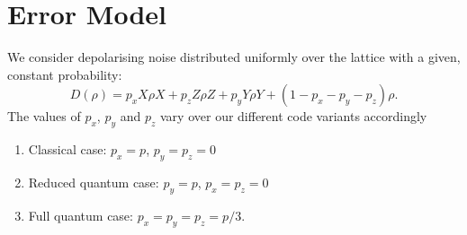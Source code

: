 




\section{Error Model}

We consider depolarising noise distributed uniformly over the lattice with a given, constant probability:
\begin{equation} \label{noise_eq}
  D(\rho) = p_x X\rho X +  p_z Z\rho Z + p_y Y\rho Y  + (1- p_x - p_y - p_z)\rho.
\end{equation}
The values of $p_x$, $p_y$ and $p_z$ vary over our different code variants accordingly
\begin{enumerate}
  \item Classical case: $p_x = p$, $p_y = p_z = 0$
  \item Reduced quantum case: $p_y = p$, $p_x = p_z = 0$
  \item Full quantum case: $p_x = p_y = p_z = p/3$.
\end{enumerate}

